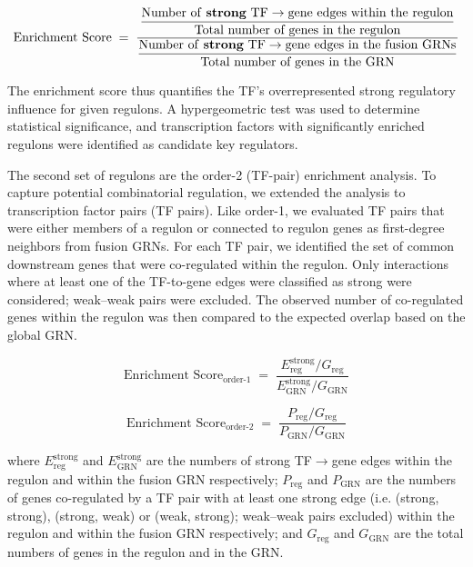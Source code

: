\documentclass[11pt]{article}
\begin{document}
\begin{equation}
\text{Enrichment Score} \;=\;
\frac{
  \dfrac{\text{Number of \textbf{strong} TF} \rightarrow \text{gene edges within the regulon}}
        {\text{Total number of genes in the regulon}}
}{
  \dfrac{\text{Number of \textbf{strong} TF} \rightarrow \text{gene edges in the fusion GRNs}}
        {\text{Total number of genes in the GRN}}
}
\end{equation}

The enrichment score thus quantifies the TF's overrepresented strong regulatory influence
for given regulons. A hypergeometric test was used to determine statistical significance,
and transcription factors with significantly enriched regulons were identified as
candidate key regulators.

The second set of regulons are the order-2 (TF-pair) enrichment analysis. To capture
potential combinatorial regulation, we extended the analysis to transcription factor
pairs (TF pairs). Like order-1, we evaluated TF pairs that were either members of a
regulon or connected to regulon genes as first-degree neighbors from fusion GRNs. For
each TF pair, we identified the set of common downstream genes that were co-regulated
within the regulon. Only interactions where at least one of the TF-to-gene edges were
classified as strong were considered; weak--weak pairs were excluded. The observed number
of co-regulated genes within the regulon was then compared to the expected overlap based
on the global GRN.

\begin{equation}
\text{Enrichment Score}_{\text{order-1}} \;=\;
\frac{E^{\text{strong}}_{\text{reg}} / G_{\text{reg}}}
     {E^{\text{strong}}_{\text{GRN}} / G_{\text{GRN}}}
\end{equation}

\begin{equation}
\text{Enrichment Score}_{\text{order-2}} \;=\;
\frac{P_{\text{reg}} / G_{\text{reg}}}
     {P_{\text{GRN}} / G_{\text{GRN}}}
\end{equation}

where $E^{\text{strong}}_{\text{reg}}$ and $E^{\text{strong}}_{\text{GRN}}$ are the
numbers of strong TF$\rightarrow$gene edges within the regulon and within the fusion
GRN respectively; $P_{\text{reg}}$ and $P_{\text{GRN}}$ are the numbers of genes
co-regulated by a TF pair with at least one strong edge (i.e. (strong, strong),
(strong, weak) or (weak, strong); weak--weak pairs excluded) within the regulon and
within the fusion GRN respectively; and $G_{\text{reg}}$ and $G_{\text{GRN}}$ are the
total numbers of genes in the regulon and in the GRN.
\end{document}
